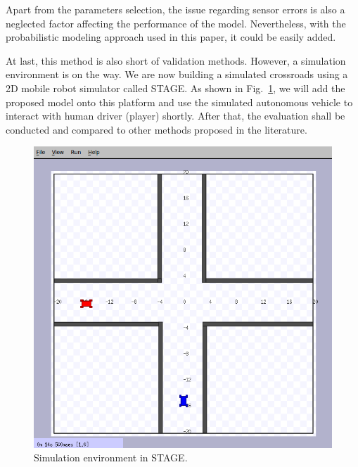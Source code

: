\documentclass[twocolumn,10pt]{asme2e}
\begin{document}
Apart from the parameters selection, the issue regarding sensor errors is also a neglected factor affecting the performance of the model. Nevertheless, with the probabilistic modeling approach used in this paper, it could be easily added. 

At last, this method is also short of validation methods. However, a simulation environment is on the way. We are now building a simulated crossroads using a 2D mobile robot simulator called STAGE. As shown in Fig.~\ref{stage}, we will add the proposed model onto this platform and use the simulated autonomous vehicle to interact with human driver (player) shortly. After that, the evaluation shall be conducted and compared to other methods proposed in the literature.  


\begin{figure}[htbp!]
\begin{center}
\includegraphics[scale=0.28]{stage.png}
\end{center}
\caption{Simulation environment in STAGE.}
\label{stage} 
\end{figure}

\end{document}
